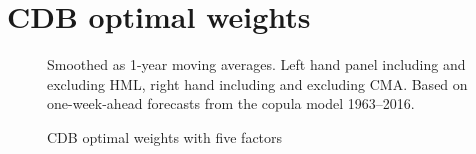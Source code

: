 
\section{CDB optimal weights} %
\label{app:cdb_weights}


\begin{figure}[htbp]
  \centering
  \footnotesize
  \renewcommand{\arraystretch}{1.2}

  \caption{CDB optimal weights with five factors}

  \begin{longcaption}
    Smoothed as 1-year moving averages. Left hand panel including and excluding HML, right hand including and excluding CMA. Based on one-week-ahead forecasts from the copula model 1963--2016.
  \end{longcaption}
  

\end{figure}
